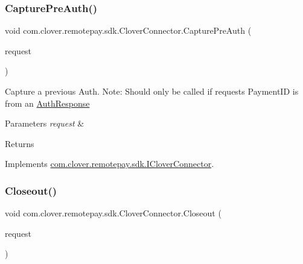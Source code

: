 \subsubsection{\texorpdfstring{Capture\+Pre\+Auth()}{CapturePreAuth()}}
{\footnotesize\ttfamily void com.\+clover.\+remotepay.\+sdk.\+Clover\+Connector.\+Capture\+Pre\+Auth (\begin{DoxyParamCaption}\item[{\hyperlink{classcom_1_1clover_1_1remotepay_1_1sdk_1_1_capture_pre_auth_request}{Capture\+Pre\+Auth\+Request}}]{request }\end{DoxyParamCaption})}



Capture a previous Auth. Note\+: Should only be called if request\textquotesingle{}s Payment\+ID is from an \hyperlink{classcom_1_1clover_1_1remotepay_1_1sdk_1_1_auth_response}{Auth\+Response} 


\begin{DoxyParams}{Parameters}
{\em request} & \\
\hline
\end{DoxyParams}
\begin{DoxyReturn}{Returns}

\end{DoxyReturn}


Implements \hyperlink{interfacecom_1_1clover_1_1remotepay_1_1sdk_1_1_i_clover_connector_a1687202a30277f4ae5dffd73b9311b94}{com.\+clover.\+remotepay.\+sdk.\+I\+Clover\+Connector}.

\mbox{\label{classcom_1_1clover_1_1remotepay_1_1sdk_1_1_clover_connector_aa8348f5f0769ad3023858d310e5aa847}} 
\subsubsection{\texorpdfstring{Closeout()}{Closeout()}}
{\footnotesize\ttfamily void com.\+clover.\+remotepay.\+sdk.\+Clover\+Connector.\+Closeout (\begin{DoxyParamCaption}\item[{\hyperlink{classcom_1_1clover_1_1remotepay_1_1sdk_1_1_closeout_request}{Closeout\+Request}}]{request }\end{DoxyParamCaption})}



